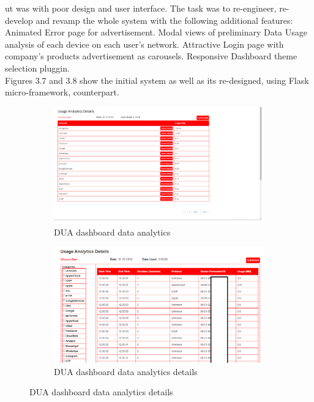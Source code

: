 \begin{itemize}
ut was with poor design and user interface. The task was to re-engineer, re-develop and revamp the whole system with the following additional features:
	\subitem Animated Error page for advertisement.
	\subitem Modal views of preliminary Data Usage analysis of each device on each user's network.
	\subitem Attractive Login page with company's products advertisement as carousels.
	\subitem Responsive Dashboard theme selection pluggin.\\
	
	
	 Figures 3.7 and 3.8 show the initial system as well as its re-designed, using Flask micro-framework, counterpart.
		\begin{figure}[!htbp]
		\centering
		\begin{subfigure}[b]{0.45\textwidth}
			\centering
			\includegraphics[width=\linewidth]{./duaformeranalytic}
			\caption{DUA dashboard data analytics}
		\end{subfigure}
		\hfill
		\begin{subfigure}[b]{0.45\textwidth}
			\centering
			\includegraphics[width=\linewidth]{./duaformeranalyticdetail}
			\caption{DUA dashboard data analytics details}

\end{subfigure}
\end{figure}
\end{itemize}
